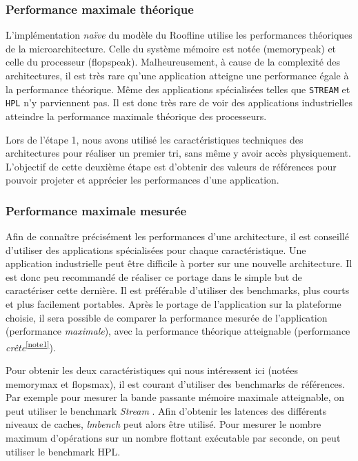     \subsubsection{Performance maximale théorique}
        
        L'implémentation \textit{naïve} \cite{Williams2008a} du modèle du Roofline utilise les performances théoriques de la microarchitecture. Celle du système mémoire est notée (\gls{memorypeak}) et celle du processeur (\gls{flopspeak}). Malheureusement, à cause de la complexité des architectures, il est très rare qu'une application atteigne une performance égale à la performance théorique. Même des applications spécialisées telles que \verb=STREAM= \cite{McCalpin1995} et \verb=HPL= \cite{Dongarra2003} n'y parviennent pas. Il est donc très rare de voir des applications industrielles atteindre la performance maximale théorique des processeurs.
        
        

        Lors de l'étape 1, nous avons utilisé les caractéristiques techniques des architectures pour réaliser un premier tri, sans même y avoir accès physiquement. L'objectif de cette deuxième étape est d'obtenir des valeurs de références pour pouvoir projeter et apprécier les performances d'une application.
    
        
    \subsubsection{Performance maximale mesurée}
    
        Afin de connaître précisément les performances d'une architecture, il est conseillé d'utiliser des applications spécialisées pour chaque caractéristique. Une application industrielle peut être difficile à porter sur une nouvelle architecture. Il est donc peu recommandé de réaliser ce portage dans le simple but de caractériser cette dernière. Il est préférable d'utiliser des \glspl{benchmark}, plus courts et plus facilement portables. Après le portage de l'application sur la plateforme choisie, il sera possible de comparer la performance mesurée de l'application (performance \textit{maximale}\protect\footnotemark), avec la performance théorique atteignable (performance \textit{crête}\textsuperscript{\ref{note1}}).

    
        Pour obtenir les deux caractéristiques qui nous intéressent ici (notées \gls{memorymax} et \gls{flopsmax}), il est courant d'utiliser des benchmarks de références. Par exemple pour mesurer la bande passante mémoire maximale atteignable, on peut utiliser le benchmark \textit{Stream} \cite{McCalpin1995}. Afin d'obtenir les latences des différents niveaux de caches, \textit{lmbench} \cite{Staelin2002} peut alors être utilisé. Pour mesurer le nombre maximum d'opérations sur un nombre flottant exécutable par seconde, on peut utiliser le benchmark HPL.
        
